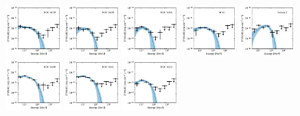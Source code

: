 \documentclass[doublespace,nopageskip]{VTthesis} %
\begin{document}
\begin{appendices}
\begin{figure}
\includegraphics[width=0.19\textwidth]{Figures/Globular/spectra/PLE_spectrum_9.pdf}
\includegraphics[width=0.19\textwidth]{Figures/Globular/spectra/PLE_spectrum_25.pdf}
\includegraphics[width=0.19\textwidth]{Figures/Globular/spectra/PLE_spectrum_12.pdf}
\includegraphics[width=0.19\textwidth]{Figures/Globular/spectra/PLE_spectrum_8.pdf}
\includegraphics[width=0.19\textwidth]{Figures/Globular/spectra/PLE_spectrum_28.pdf}
\includegraphics[width=0.19\textwidth]{Figures/Globular/spectra/PLE_spectrum_18.pdf}
\includegraphics[width=0.19\textwidth]{Figures/Globular/spectra/PLE_spectrum_19.pdf}
\includegraphics[width=0.19\textwidth]{Figures/Globular/spectra/PLE_spectrum_22.pdf}

\end{figure}
\end{appendices}
\end{document}
